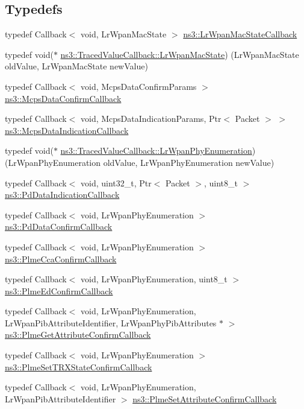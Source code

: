 \subsection*{Typedefs}
\begin{DoxyCompactItemize}
\item 
typedef Callback$<$ void, Lr\+Wpan\+Mac\+State $>$ \hyperlink{group__lr-wpan_ga592f91469c801150297e7f1ac939b7ff}{ns3\+::\+Lr\+Wpan\+Mac\+State\+Callback}
\item 
typedef void($\ast$ \hyperlink{group__lr-wpan_gab113a3a2c9eb8193a72835890954f1db}{ns3\+::\+Traced\+Value\+Callback\+::\+Lr\+Wpan\+Mac\+State}) (Lr\+Wpan\+Mac\+State old\+Value, Lr\+Wpan\+Mac\+State new\+Value)
\item 
typedef Callback$<$ void, Mcps\+Data\+Confirm\+Params $>$ \hyperlink{group__lr-wpan_ga00a61304d3d1c08a4fa8ae483f960001}{ns3\+::\+Mcps\+Data\+Confirm\+Callback}
\item 
typedef Callback$<$ void, Mcps\+Data\+Indication\+Params, Ptr$<$ Packet $>$ $>$ \hyperlink{group__lr-wpan_ga1635d218f83c7d0107b268080efd317b}{ns3\+::\+Mcps\+Data\+Indication\+Callback}
\item 
typedef void($\ast$ \hyperlink{group__lr-wpan_ga83e29cd3a6a828f93f66faedbd978113}{ns3\+::\+Traced\+Value\+Callback\+::\+Lr\+Wpan\+Phy\+Enumeration}) (Lr\+Wpan\+Phy\+Enumeration old\+Value, Lr\+Wpan\+Phy\+Enumeration new\+Value)
\item 
typedef Callback$<$ void, uint32\+\_\+t, Ptr$<$ Packet $>$, uint8\+\_\+t $>$ \hyperlink{group__lr-wpan_ga5942bd2136b995f9104db9cfc311ace3}{ns3\+::\+Pd\+Data\+Indication\+Callback}
\item 
typedef Callback$<$ void, Lr\+Wpan\+Phy\+Enumeration $>$ \hyperlink{group__lr-wpan_ga0cba923353248fc2a8dc81303c6d5e35}{ns3\+::\+Pd\+Data\+Confirm\+Callback}
\item 
typedef Callback$<$ void, Lr\+Wpan\+Phy\+Enumeration $>$ \hyperlink{group__lr-wpan_gafd859f54b5982ab4c85838a40b1c7340}{ns3\+::\+Plme\+Cca\+Confirm\+Callback}
\item 
typedef Callback$<$ void, Lr\+Wpan\+Phy\+Enumeration, uint8\+\_\+t $>$ \hyperlink{group__lr-wpan_gadecf12d559c4db545036668cf9a384b6}{ns3\+::\+Plme\+Ed\+Confirm\+Callback}
\item 
typedef Callback$<$ void, Lr\+Wpan\+Phy\+Enumeration, Lr\+Wpan\+Pib\+Attribute\+Identifier, Lr\+Wpan\+Phy\+Pib\+Attributes $\ast$ $>$ \hyperlink{group__lr-wpan_ga024ef2b58b799155fc114f3d895ca283}{ns3\+::\+Plme\+Get\+Attribute\+Confirm\+Callback}
\item 
typedef Callback$<$ void, Lr\+Wpan\+Phy\+Enumeration $>$ \hyperlink{group__lr-wpan_ga65eacebda6dc7c1611bea032c5a525a7}{ns3\+::\+Plme\+Set\+T\+R\+X\+State\+Confirm\+Callback}
\item 
typedef Callback$<$ void, Lr\+Wpan\+Phy\+Enumeration, Lr\+Wpan\+Pib\+Attribute\+Identifier $>$ \hyperlink{group__lr-wpan_gab86861c72f1d605df34795c411122e68}{ns3\+::\+Plme\+Set\+Attribute\+Confirm\+Callback}
\end{DoxyCompactItemize}
